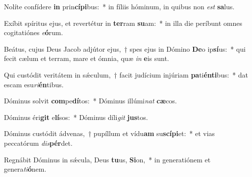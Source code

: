 \item Nolíte confídere \textbf{in} prin\textbf{cí}\textbf{pi}bus:~* in fíliis hóminum, in quibus non \textit{est} \textbf{sa}lus.
\item Exíbit spíritus ejus, et revertétur in \textbf{ter}ram \textbf{su}am:~* in illa die períbunt omnes cogitatiónes \textit{e}\textbf{ó}rum.
\item Beátus, cujus Deus Jacob adjútor ejus,~† spes ejus in Dómino \textbf{De}o ip\textbf{sí}us:~* qui fecit cælum et terram, mare et ómnia, quæ \textit{in} \textbf{e}is sunt.
\item Qui custódit veritátem in sǽculum,~† facit judícium injúriam \textbf{pa}ti\textbf{én}\textbf{ti}bus:~* dat escam esu\textit{ri}\textbf{én}tibus.
\item Dóminus solvit \textbf{com}pe\textbf{dí}tos:~* Dóminus illúmi\textit{nat} \textbf{cæ}cos.
\item Dóminus éri\textbf{git} e\textbf{lí}sos:~* Dóminus díli\textit{git} \textbf{jus}tos.
\item Dóminus custódit ádvenas,~† pupíllum et vídu\textbf{am} su\textbf{scí}\textbf{pi}et:~* et vias peccatórum \textit{dis}\textbf{pér}det.
\item Regnábit Dóminus in sǽcula, Deus \textbf{tu}us, \textbf{Si}on,~* in generatiónem et genera\textit{ti}\textbf{ó}nem.
